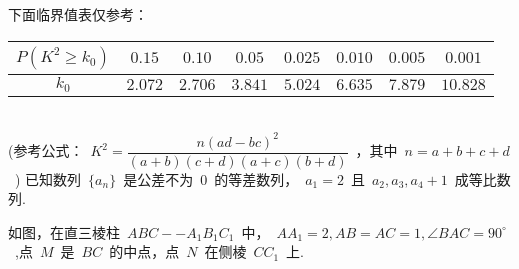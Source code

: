 \documentclass[printbox]{BHCexam}
\begin{document}
\begin{questions}
下面临界值表仅参考：
\begin{tabular}{|c|c|c|c|c|c|c|c|}
\hline
$P(K^2\geq k_0)$&$0.15$&$0.10$&$0.05$&$0.025$&$0.010$&$0.005$&$0.001$\\
\hline
$k_0$&$2.072$&$2.706$&$3.841$&$5.024$&$6.635$&$7.879$&$10.828$\\
\hline
\end{tabular}\\
(参考公式：~$K^2=\dfrac{n(ad-bc)^2}{(a+b)(c+d)(a+c)(b+d)}$~，其中~$n=a+b+c+d$~)
\vspace{8cm}
\question 已知数列~$\{a_n \}$~是公差不为~$0$~的等差数列，~$a_1=2$~且~$a_2,a_3,a_4+1$~成等比数列.
\vspace{6cm}
\question 如图，在直三棱柱~$ABC--A_1B_1C_1$~中，~$AA_1=2,AB=AC=1,\angle BAC=90^{\circ}$~,点~$M$~是~$BC$~的中点，点~$N$~在侧棱~$CC_1$~上.
\end{questions}
\end{document}
